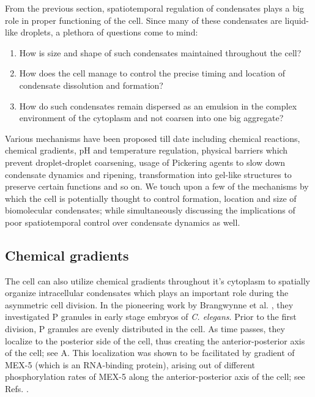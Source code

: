 From the previous section, spatiotemporal regulation of condensates plays a big role in proper functioning of the cell. 
Since many of these condensates are liquid-like droplets, a plethora of questions come to mind: 
\begin{enumerate}

    \item How is size and shape of such condensates maintained throughout the cell?
    
    
    \item How does the cell manage to control the precise timing and location of condensate dissolution and formation?
    
    \item How do such condensates remain dispersed as an emulsion in the complex environment of the cytoplasm and not coarsen into one big aggregate?

\end{enumerate}
Various mechanisms have been proposed till date including chemical reactions, chemical gradients, pH and temperature regulation, physical barriers which prevent droplet-droplet coarsening, usage of Pickering agents to slow down condensate dynamics and ripening, transformation into gel-like structures to preserve certain functions and so on.
We touch upon a few of the mechanisms by which the cell is potentially thought to
control formation, location and size of biomolecular condensates; while simultaneously discussing the implications of poor spatiotemporal control over condensate dynamics as well.

\subsection{Chemical gradients}

The cell can also utilize chemical gradients throughout it's cytoplasm to spatially organize intracellular condensates which plays an important role during the asymmetric cell division. 
In the pioneering work by Brangwynne et al. \cite{Brangwynne2009}, they investigated P granules in early stage embryos of \textit{C. elegans}.
Prior to the first division, P granules are evenly distributed in the cell.
As time passes, they localize to the posterior side of the cell, thus creating the anterior-posterior axis of the cell; see A. 
This localization was shown to be facilitated by gradient of MEX-5 (which is an RNA-binding protein), arising out of different phosphorylation rates of MEX-5 along the anterior-posterior axis of the cell; see Refs. \cite{Griffin2011,Benelli_2020,Wu2018}.

